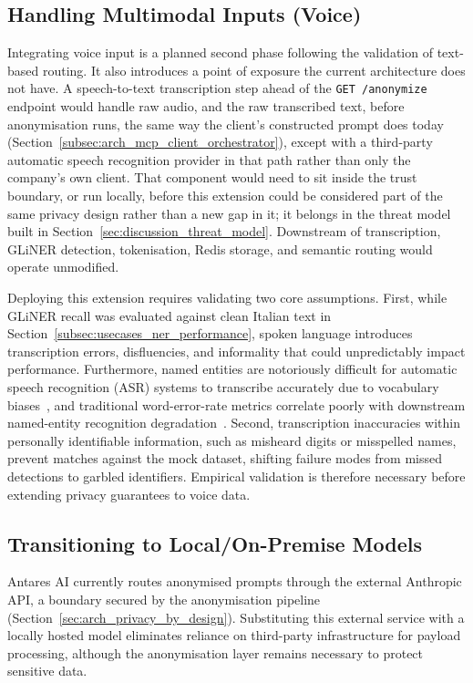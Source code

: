 \subsection{Handling Multimodal Inputs (Voice)}
\label{subsec:discussion_voice}

Integrating voice input is a planned second phase following the validation of text-based routing. It also introduces a point of exposure the current architecture does not have. A speech-to-text transcription step ahead of the \texttt{GET /anonymize} endpoint would handle raw audio, and the raw transcribed text, before anonymisation runs, the same way the client's constructed prompt does today (Section~\ref{subsec:arch_mcp_client_orchestrator}), except with a third-party automatic speech recognition provider in that path rather than only the company's own client. That component would need to sit inside the trust boundary, or run locally, before this extension could be considered part of the same privacy design rather than a new gap in it; it belongs in the threat model built in Section~\ref{sec:discussion_threat_model}. Downstream of transcription, GLiNER detection, tokenisation, Redis storage, and semantic routing would operate unmodified.

Deploying this extension requires validating two core assumptions. First, while GLiNER recall was evaluated against clean Italian text in Section~\ref{subsec:usecases_ner_performance}, spoken language introduces transcription errors, disfluencies, and informality that could unpredictably impact performance. Furthermore, named entities are notoriously difficult for automatic speech recognition (ASR) systems to transcribe accurately due to vocabulary biases~\cite{mao2020underrepresented}, and traditional word-error-rate metrics correlate poorly with downstream named-entity recognition degradation~\cite{jannet2015asrner}. Second, transcription inaccuracies within personally identifiable information, such as misheard digits or misspelled names, prevent matches against the mock dataset, shifting failure modes from missed detections to garbled identifiers. Empirical validation is therefore necessary before extending privacy guarantees to voice data.

\subsection{Transitioning to Local/On-Premise Models}
\label{subsec:discussion_local_models}

Antares AI currently routes anonymised prompts through the external Anthropic API, a boundary secured by the anonymisation pipeline (Section~\ref{sec:arch_privacy_by_design}). Substituting this external service with a locally hosted model eliminates reliance on third-party infrastructure for payload processing, although the anonymisation layer remains necessary to protect sensitive data.

